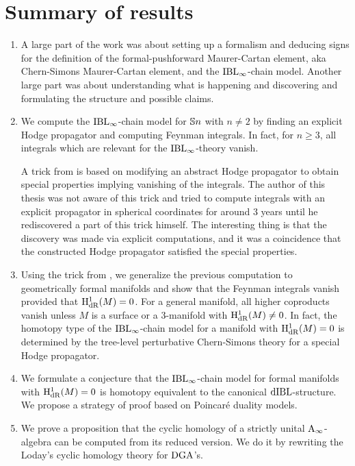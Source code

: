\documentclass[\MainFolder/Text.tex]{subfiles}
\begin{document}
\section{Summary of results}

\begin{enumerate}[label=\arabic*)]

\item A large part of the work was about setting up a formalism and deducing signs for the definition of the formal-pushforward Maurer-Cartan element, aka Chern-Simons Maurer-Cartan element, and the $\mathrm{IBL}_\infty$-chain model. Another large part was about understanding what is happening and discovering and formulating the structure and possible claims.

\item We compute the $\mathrm{IBL}_\infty$-chain model for $\mathbb{S}{n}$ with $n\neq 2$ by finding an explicit Hodge propagator and computing Feynman integrals. In fact, for $n\ge 3$, all integrals which are relevant for the $\mathrm{IBL}_\infty$-theory vanish.
 
A trick from \cite{Mnev2009} is based on modifying an abstract Hodge propagator to obtain special properties implying vanishing of the integrals. The author of this thesis was not aware of this trick and tried to compute integrals with an explicit propagator in spherical coordinates for around 3 years until he rediscovered a part of this trick himself. The interesting thing is that the discovery was made via explicit computations, and it was a coincidence that the constructed Hodge propagator satisfied the special properties.
 
\item Using the trick from \cite{Mnev2009}, we generalize the previous computation to geometrically formal manifolds and show that the Feynman integrals vanish provided that $\mathrm{H}_{\mathrm{dR}}^1(M) = 0$. For a general manifold, all higher coproducts vanish unless $M$ is a surface or a $3$-manifold with $\mathrm{H}_{\mathrm{dR}}^1(M) \neq 0$. In fact, the homotopy type of the $\mathrm{IBL}_\infty$-chain model for a manifold with $\mathrm{H}_{\mathrm{dR}}^1(M) = 0$ is determined by the tree-level perturbative Chern-Simons theory for a special Hodge propagator.

\item We formulate a conjecture that the $\mathrm{IBL}_\infty$-chain model for formal manifolds with $\mathrm{H}_{\mathrm{dR}}^1(M) = 0$ is homotopy equivalent to the canonical $\mathrm{dIBL}$-structure. We propose a strategy of proof based on Poincar\'e duality models.
 
\item We prove a proposition that the cyclic homology of a strictly unital $\mathrm{A}_\infty$-algebra can be computed from its reduced version. We do it by rewriting the Loday's cyclic homology theory for $\mathrm{DGA}$'s.


\end{enumerate}
\end{document}
